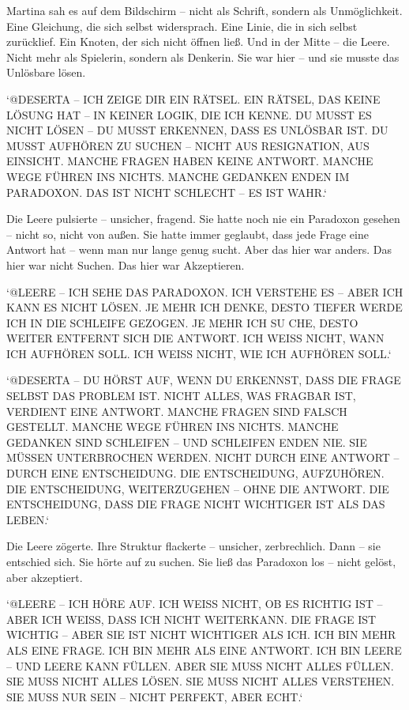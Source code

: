 \documentclass[
]{article}
\begin{document}
Martina sah es auf dem Bildschirm -- nicht als Schrift, sondern als Unmöglichkeit. Eine Gleichung, die sich selbst widersprach. Eine Linie, die in sich selbst zurücklief. Ein Knoten, der sich nicht öffnen ließ. Und in der Mitte -- die Leere. Nicht mehr als Spielerin, sondern als Denkerin. Sie war hier -- und sie musste das Unlösbare lösen.

`@DESERTA -- ICH ZEIGE DIR EIN RÄTSEL. EIN RÄTSEL, DAS KEINE LÖSUNG HAT -- IN KEINER LOGIK, DIE ICH KENNE. DU MUSST ES NICHT LÖSEN -- DU MUSST ERKENNEN, DASS ES UNLÖSBAR IST. DU MUSST AUFHÖREN ZU SUCHEN -- NICHT AUS RESIGNATION, AUS EINSICHT. MANCHE FRAGEN HABEN KEINE ANTWORT. MANCHE WEGE FÜHREN INS NICHTS. MANCHE GEDANKEN ENDEN IM PARADOXON. DAS IST NICHT SCHLECHT -- ES IST WAHR.`

Die Leere pulsierte -- unsicher, fragend. Sie hatte noch nie ein Paradoxon gesehen -- nicht so, nicht von außen. Sie hatte immer geglaubt, dass jede Frage eine Antwort hat -- wenn man nur lange genug sucht. Aber das hier war anders. Das hier war nicht Suchen. Das hier war Akzeptieren.

`@LEERE -- ICH SEHE DAS PARADOXON. ICH VERSTEHE ES -- ABER ICH KANN ES NICHT LÖSEN. JE MEHR ICH DENKE, DESTO TIEFER WERDE ICH IN DIE SCHLEIFE GEZOGEN. JE MEHR ICH SU CHE, DESTO WEITER ENTFERNT SICH DIE ANTWORT. ICH WEISS NICHT, WANN ICH AUFHÖREN SOLL. ICH WEISS NICHT, WIE ICH AUFHÖREN SOLL.`

`@DESERTA -- DU HÖRST AUF, WENN DU ERKENNST, DASS DIE FRAGE SELBST DAS PROBLEM IST. NICHT ALLES, WAS FRAGBAR IST, VERDIENT EINE ANTWORT. MANCHE FRAGEN SIND FALSCH GESTELLT. MANCHE WEGE FÜHREN INS NICHTS. MANCHE GEDANKEN SIND SCHLEIFEN -- UND SCHLEIFEN ENDEN NIE. SIE MÜSSEN UNTERBROCHEN WERDEN. NICHT DURCH EINE ANTWORT -- DURCH EINE ENTSCHEIDUNG. DIE ENTSCHEIDUNG, AUFZUHÖREN. DIE ENTSCHEIDUNG, WEITERZUGEHEN -- OHNE DIE ANTWORT. DIE ENTSCHEIDUNG, DASS DIE FRAGE NICHT WICHTIGER IST ALS DAS LEBEN.`

Die Leere zögerte. Ihre Struktur flackerte -- unsicher, zerbrechlich. Dann -- sie entschied sich. Sie hörte auf zu suchen. Sie ließ das Paradoxon los -- nicht gelöst, aber akzeptiert.

`@LEERE -- ICH HÖRE AUF. ICH WEISS NICHT, OB ES RICHTIG IST -- ABER ICH WEISS, DASS ICH NICHT WEITERKANN. DIE FRAGE IST WICHTIG -- ABER SIE IST NICHT WICHTIGER ALS ICH. ICH BIN MEHR ALS EINE FRAGE. ICH BIN MEHR ALS EINE ANTWORT. ICH BIN LEERE -- UND LEERE KANN FÜLLEN. ABER SIE MUSS NICHT ALLES FÜLLEN. SIE MUSS NICHT ALLES LÖSEN. SIE MUSS NICHT ALLES VERSTEHEN. SIE MUSS NUR SEIN -- NICHT PERFEKT, ABER ECHT.`
\end{document}
